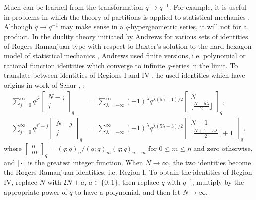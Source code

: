 \documentclass[12pt,reqno]{amsart}
\theoremstyle{remark}
\theoremstyle{definition}
\numberwithin{theorem}{section} \numberwithin{equation}{section}
\numberwithin{example}{section}
\begin{document}
Much can be learned from the transformation $q\rightarrow q^{-1}$.  For example, it is useful in problems in which the theory of partitions is applied to statistical mechanics \cite{A3, AB, ABF}.  Although $q\rightarrow q^{-1}$ may make sense in a $q$-hypergeometric series, it will not for a product.  In the duality theory initiated by Andrews \cite{A3} for various sets of identities of Rogers-Ramanjuan type with respect to Baxter's solution to the hard hexagon model of statistical mechanics \cite{Bax}, Andrews used finite versions, i.e. polynomial or rational function identities which converge to infinite $q$-series in the limit.  To translate between identities of Regions I and IV \cite{A3, Bax}, he used identities  which have origins in work of Schur \cite{A0,Sch}, 
 \cite[4.1, 4.2]{A3}:
\begin{align}
\sum_{j=0}^{\infty}q^{j^2}\left [\begin{matrix} N-j \\ j   \end{matrix} \right]_q&=\sum_{\lambda=-\infty}^{\infty}(-1)^{\lambda}q^{\lambda(5\lambda+1)/2}\left [\begin{matrix} N \\ \lfloor \frac{N-5\lambda}{2}   \rfloor  \end{matrix} \right]_q,\label{equation:Andrews-4.1}\\
\sum_{j=0}^{\infty}q^{j^2+j}\left [\begin{matrix} N-j \\ j   \end{matrix} \right]_q&=\sum_{\lambda=-\infty}^{\infty}(-1)^{\lambda}q^{\lambda(5\lambda-3)/2}\left [\begin{matrix} N+1 \\ \lfloor  \frac{N+1-5\lambda}{2}   \rfloor  +1 \end{matrix} \right]_q,\label{equation:Andrews-4.2}
\end{align}
where $\left [\begin{matrix} n \\ m   \end{matrix}\right ] _q=(q;q)_n/(q;q)_m(q;q)_{n-m}$ for $0\le m\le n$ and zero otherwise, and $\lfloor \cdot \rfloor$ is the greatest integer function.  When $N\rightarrow \infty$, the two identities become the Rogers-Ramanjuan identities, i.e. Region I.  To obtain the identities of Region IV, replace $N$ with $2N+a$, $a\in\{0,1\}$,  then replace $q$ with $q^{-1}$, multiply by the appropriate power of $q$ to have a polynomial, and then let $N\rightarrow \infty$.
\end{document}
